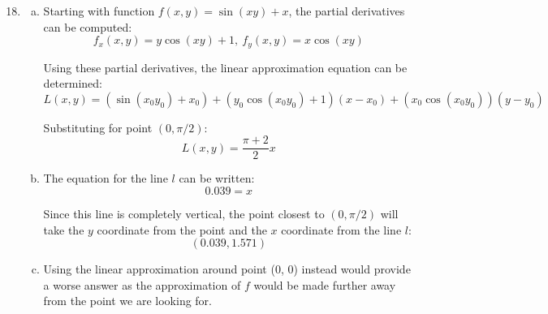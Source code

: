 \documentclass{article}
\begin{document}
\begin{enumerate}[1.]
  \setcounter{enumi}{17}
  \item \begin{enumerate}[a.]
    \item Starting with function $f(x, y) = \sin (x y) + x$, the partial
      derivatives can be computed:
      $$ f_{x}(x, y) = y \cos (x y) + 1,\ f_{y}(x, y) = x \cos (x y) $$

      Using these partial derivatives, the linear approximation equation can be
      determined:
      $$ L(x, y) = (\sin (x_{0} y_{0}) + x_{0}) + (y_{0} \cos(x_{0} y_{0}) +
      1)(x - x_{0}) + (x_{0} \cos(x_{0} y_{0}))(y - y_{0})$$

      Substituting for point $(0, \pi / 2)$:
      $$ L(x, y) = \frac{ \pi + 2 }{ 2 } x $$

    \item The equation for the line $l$ can be written:
      $$ 0.039 = x $$

      Since this line is completely vertical, the point closest to $(0, \pi /
      2)$ will take the $y$ coordinate from the point and the $x$ coordinate
      from the line $l$:
      $$ (0.039, 1.571) $$

    \item Using the linear approximation around point (0, 0) instead would
      provide a worse answer as the approximation of $f$ would be made further
      away from the point we are looking for.

  \end{enumerate}
\end{enumerate}
\end{document}
